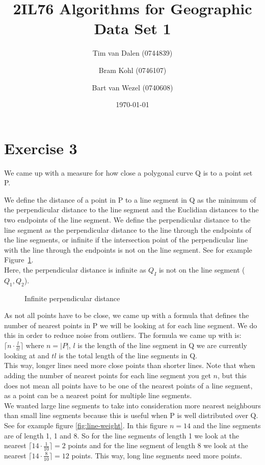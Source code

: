 \documentclass[a4paper,11pt]{article}
\title{
	2IL76 Algorithms for Geographic Data Set 1 \\
}
\author{
	Tim van Dalen (0744839)
	\and
	Bram Kohl (0746107)
	\and
	Bart van Wezel (0740608)
}
\date{\today}
\begin{document}
	\maketitle
	
\section*{Exercise 3}
We came up with a measure for how close a polygonal curve Q is to a point set P.

We define the distance of a point in P to a line segment in Q as the minimum of the perpendicular distance to the line segment and the Euclidian distances to the two endpoints of the line segment.
We define the perpendicular distance to the line segment as the perpendicular distance to the line through the endpoints of the line segments, or infinite if the intersection point of the perpendicular line with the line through the endpoints is not on the line segment.
See for example Figure~\ref{fig:perp-distance}.\\


Here, the perpendicular distance is infinite as $Q_I$ is not on the line segment ($Q_1,Q_2$).

\begin{figure}[H]
	\centering
	\def\svgwidth{0.5\textwidth}
	
	\caption{Infinite perpendicular distance}
	\label{fig:perp-distance}
\end{figure}

As not all points have to be close, we came up with a formula that defines the number of nearest points in P we will be looking at for each line segment.
We do this in order to reduce noise from outliers.
The formula we came up with is: $\lceil n\cdot \frac{l}{tl}\rceil$ where $n = |P|$, $l$ is the length of the line segment in Q we are currently looking at and $tl$ is the total length of the line segments in Q.\\


This way, longer lines need more close points than shorter lines.
Note that when adding the number of nearest points for each line segment you get $n$, but this does not mean all points have to be one of the nearest points of a line segment, as a point can be a nearest point for multiple line segments.\\

We wanted large line segments to take into consideration more nearest neighbours than small line segments because this is useful when P is well distributed over Q.
See for example figure \ref{fig:line-weight}. In this figure $n = 14$ and the line segments are of length 1, 1 and 8. So for the line segments of length 1 we look at the nearest $\lceil 14\cdot \frac{1}{10}\rceil = 2$ points and for the line segment of length 8 we look at the nearest $\lceil 14\cdot \frac{8}{10}\rceil = 12$ points. This way, long line segments need more points.
\end{document}
